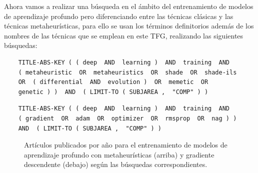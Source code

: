 Ahora vamos a realizar una búsqueda en el ámbito del entrenamiento de modelos de aprendizaje profundo pero diferenciando entre las técnicas clásicas y las técnicas metaheurísticas, para ello se usan los términos definitorios además de los nombres de las técnicas que se emplean en este TFG, realizando las siguientes búsquedas:

\begin{verbatim}
	TITLE-ABS-KEY ( ( deep  AND  learning )  AND  training  AND 
	( metaheuristic  OR  metaheuristics  OR  shade  OR  shade-ils 
	OR  ( differential  AND  evolution )  OR  memetic  OR 
	genetic ) )  AND  ( LIMIT-TO ( SUBJAREA ,  "COMP" ) )

\end{verbatim}

\begin{verbatim}
	TITLE-ABS-KEY ( ( deep  AND  learning )  AND  training  AND 
	( gradient  OR  adam  OR  optimizer  OR  rmsprop  OR  nag ) )  
	AND  ( LIMIT-TO ( SUBJAREA ,  "COMP" ) ) 
\end{verbatim}

\begin{figure}[!tbp]
\label{fig:resEdA}
  \centering
  \hfill
  \caption{Artículos publicados por año para el entrenamiento de modelos de aprendizaje profundo con metaheurísticas (arriba) y gradiente descendente (debajo) según las búsquedas correspondientes.}
\end{figure}

